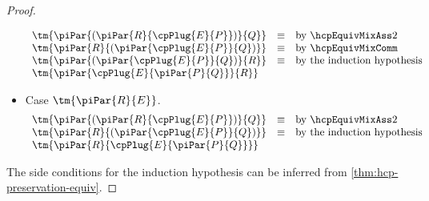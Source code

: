 \begin{proof}
\begin{itemize}
\begin{gather*}
\begin{array}{lcl}
        \tm{\piPar{( \piPar{R}{\cpPlug{E}{P}} )}{Q}} &\equiv &\text{by }\hcpEquivMixAss2 \\
        \tm{\piPar{R}{( \piPar{\cpPlug{E}{P}}{Q} )}} &\equiv &\text{by }\hcpEquivMixComm \\
        \tm{\piPar{( \piPar{\cpPlug{E}{P}}{Q} )}{R}} &\equiv &\text{by the induction hypothesis} \\
        \tm{\piPar{\cpPlug{E}{\piPar{P}{Q}}}{R}}
      \end{array}
    \end{gather*}
  \item
    Case $\tm{\piPar{R}{E}}$.
    \begin{gather*}
      \begin{array}{lcl}
        \tm{\piPar{( \piPar{R}{\cpPlug{E}{P}} )}{Q}} &\equiv &\text{by }\hcpEquivMixAss2 \\
        \tm{\piPar{R}{( \piPar{\cpPlug{E}{P}}{Q} )}} &\equiv &\text{by the induction hypothesis} \\
        \tm{\piPar{R}{\cpPlug{E}{\piPar{P}{Q}}}}
      \end{array}
    \end{gather*}
  \end{itemize}
  The side conditions for the induction hypothesis can be inferred from
  \cref{thm:hcp-preservation-equiv}.
\end{proof}
